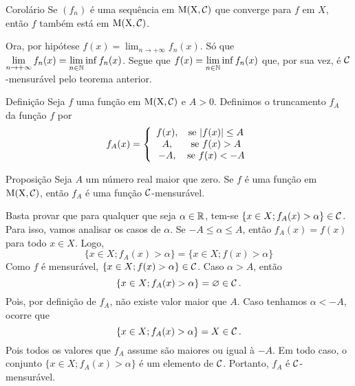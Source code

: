 \begin{env}{Corolário}
	\label{cor:convergencia-de-uma-sequencia-mensuravel}
	Se $(f_n)$ é uma sequência em $\operatorname{M(X, \mathcal{C} )}$ que converge para $f$ em $X$, então
	$f$ também está em $\operatorname{M(X, \mathcal{C} )}$.
	\vspace{-0.2cm}
\end{env}
\begin{prova}
	Ora, por hipótese $\displaystyle f(x) = \lim_{n \to +\infty} f_n(x)$.
	Só que $\displaystyle \lim_{n \to +\infty} f_n(x) = \lim_{n \in \operatorname{\mathbb{N}}} \inf f_n(x)$.
	Segue que $\displaystyle f(x) = \lim_{n \in \operatorname{\mathbb{N}}} \inf f_n(x)$ que, por sua vez, é $\operatorname{\mathcal{C}}$-mensurável pelo teorema anterior.
\end{prova}

\begin{env}{Definição}
	Seja $f$ uma função em $\operatorname{M(X, \mathcal{C} )}$ e $A > 0$.
	Definimos o truncamento $f_A$ da função $f$ por
	$$ f_A(x) =
	\left\{\begin{array}{cc}
		f(x), & \textrm{se\ } |f(x)| \leq A \\
		A, & \textrm{se\ } f(x) > A \\
		-A, & \textrm{se\ } f(x) < -A 
	\end{array}\right.
	\vspace{-0.4cm}
	$$
\end{env}
\begin{env}{Proposição}
	\label{prop:truncamento-mensurável}
	Seja $A$ um número real maior que zero.
	Se $f$ é uma função em $\operatorname{M(X, \mathcal{C} )}$, então $f_A$ é uma função $\operatorname{\mathcal{C}}$-mensurável.
\end{env}
\begin{prova}
	Basta provar que para qualquer que seja $\alpha \in \mathbb{R}$, tem-se $\{x \in X; f_A(x) > \alpha\} \in \operatorname{\mathcal{C}}$.
	Para isso, vamos analisar os casos de $\alpha$.
	Se $-A \leq \alpha \leq A$, então $f_A(x) = f(x)$ para todo $x \in X$.
	Logo, 
	$$
	\{x \in X; f_A(x) > \alpha \} = \{x \in X; f(x) > \alpha \}
	$$
	Como $f$ é mensurável, $\{x \in X; f(x) > \alpha \} \in \operatorname{\mathcal{C}}$.
	Caso $\alpha > A$, então
	$$
	\{x \in X; f_A(x) > \alpha \} = \varnothing \in \operatorname{\mathcal{C}}.
	$$
	Pois, por definição de $f_A$, não existe valor maior que $A$.
	Caso tenhamos $\alpha < -A$, ocorre que
	$$
	\{x \in X; f_A(x) > \alpha \} = X \in \operatorname{\mathcal{C}}.
	$$
	Pois todos os valores que $f_A$ assume são maiores ou igual à $-A$.
	Em todo caso, o conjunto $\{x \in X; f_A(x) > \alpha\}$ é um elemento de $\operatorname{\mathcal{C}}$.
	Portanto, $f_A$ é $\operatorname{\mathcal{C}}$-mensurável. 
\end{prova}

